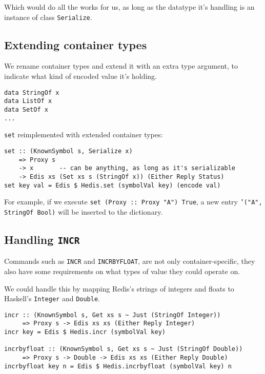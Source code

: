 \documentclass[pldi]{sigplanconf-pldi16}
\begin{document}
Which would do all the works for us, as long as the datatype it's handling is
 an instance of class \texttt{Serialize}.\footnotemark


\subsection{Extending container types}
We rename container types and extend it with an extra type argument,
 to indicate what kind of encoded value it's holding.

\begin{verbatim}
data StringOf x
data ListOf x
data SetOf x
...
\end{verbatim}

\texttt{set} reimplemented with extended container types:

\begin{verbatim}
set :: (KnownSymbol s, Serialize x)
    => Proxy s
    -> x       -- can be anything, as long as it's serializable
    -> Edis xs (Set xs s (StringOf x)) (Either Reply Status)
set key val = Edis $ Hedis.set (symbolVal key) (encode val)
\end{verbatim}

For example, if we execute \texttt{set (Proxy :: Proxy "A") True},
 a new entry \texttt{'}\texttt{("A", StringOf Bool)} will
 be inserted to the dictionary.

\subsection{Handling \texttt{INCR}}

Commands such as \texttt{INCR} and \texttt{INCRBYFLOAT}, are
 not only container-specific, they also have some requirements on what types of
 value they could operate on.

We could handle this by mapping Redis's strings of integers and floats to
 Haskell's \texttt{Integer} and \texttt{Double}.

\begin{verbatim}
incr :: (KnownSymbol s, Get xs s ~ Just (StringOf Integer))
     => Proxy s -> Edis xs xs (Either Reply Integer)
incr key = Edis $ Hedis.incr (symbolVal key)

incrbyfloat :: (KnownSymbol s, Get xs s ~ Just (StringOf Double))
     => Proxy s -> Double -> Edis xs xs (Either Reply Double)
incrbyfloat key n = Edis $ Hedis.incrbyfloat (symbolVal key) n
\end{verbatim}
\end{document}
